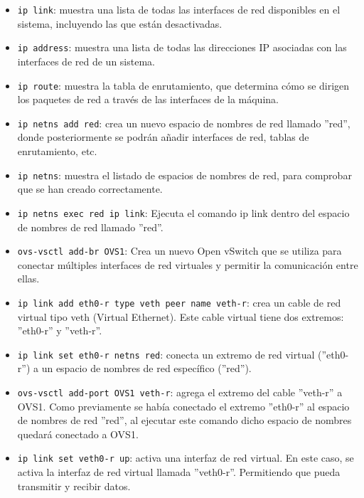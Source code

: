 \documentclass[a4paper, 12pt]{book}
\begin{document}
	\begin{itemize}
		\item \verb*|ip link|: muestra una lista de todas las interfaces de red disponibles en el sistema, incluyendo las que están desactivadas.
		
		\item \verb*|ip address|: muestra una lista de todas las direcciones IP asociadas con las interfaces de red de un sistema.
		
		\item \verb*|ip route|: muestra la tabla de enrutamiento, que determina cómo se dirigen los paquetes de red a través de las interfaces de la máquina.
		
		\item \verb*|ip netns add red|: crea un nuevo espacio de nombres de red llamado ''red'', donde posteriormente se podrán añadir interfaces de red, tablas de enrutamiento, etc. 
		
		\item \verb*|ip netns|: muestra el listado de espacios de nombres de red, para comprobar que se han creado correctamente.
		
		\item \verb*|ip netns exec red ip link|: Ejecuta el comando ip link dentro del espacio de nombres de red llamado ''red''. 
			
		\item \verb*|ovs-vsctl add-br OVS1|: Crea un nuevo Open vSwitch que se utiliza para conectar múltiples interfaces de red virtuales y permitir la comunicación entre ellas. 
				
		\item \verb*|ip link add eth0-r type veth peer name veth-r|:  crea un cable de red virtual tipo veth (Virtual Ethernet). Este cable virtual tiene dos extremos: ''eth0-r'' y ''veth-r''.
		
		\item \verb*|ip link set eth0-r netns red|: conecta un extremo de red virtual (''eth0-r'') a un espacio de nombres de red específico (''red''). 
		
		\item \verb*|ovs-vsctl add-port OVS1 veth-r|: agrega el extremo del cable ''veth-r'' a OVS1. Como previamente se había conectado el extremo ''eth0-r'' al espacio de nombres de red ''red'', al ejecutar este comando dicho espacio de nombres quedará conectado a OVS1.
		
		\item \verb*|ip link set veth0-r up|: activa una interfaz de red virtual. En este caso, se activa la interfaz de red virtual llamada ''veth0-r''. Permitiendo que pueda transmitir y recibir datos. 
		

\end{itemize}
\end{document}
